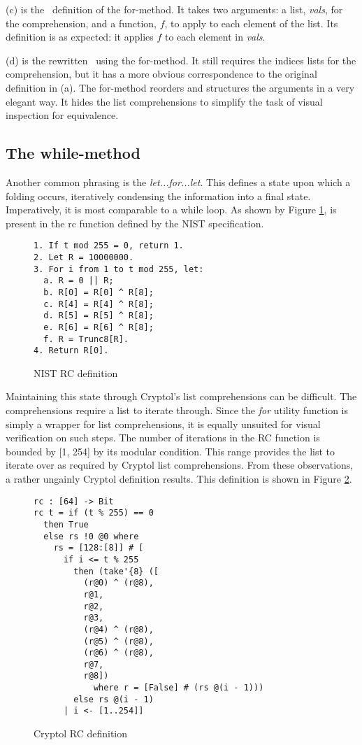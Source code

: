 (c) is the \cryptol\ definition of the for-method.
It takes two arguments: a list, \emph{vals}, for the comprehension, and a function, $f$, to apply to each element of the list.
Its definition is as expected: it applies $f$ to each element in \emph{vals}.

(d) is the rewritten \cryptol\ using the for-method.
It still requires the indices lists for the comprehension, but it has a more obvious correspondence to the original definition in (a).
The for-method reorders and structures the arguments in a very elegant way.
It hides the list comprehensions to simplify the task of visual inspection for equivalence.

\subsection{The while-method}
Another common phrasing is the \emph{let...for...let}. 
This defines a state upon which a folding occurs, iteratively condensing the information into a final state. 
Imperatively, it is most comparable to a while loop. 
As shown by Figure \ref{fig:nistRC}, is present in the rc function defined by the NIST specification.

\begin{figure}[h]
  \centering
\begin{lstlisting}[basewidth = {.5em},basicstyle={\scriptsize}]
1. If t mod 255 = 0, return 1.
2. Let R = 10000000.
3. For i from 1 to t mod 255, let:
  a. R = 0 || R;
  b. R[0] = R[0] ^ R[8];
  c. R[4] = R[4] ^ R[8];
  d. R[5] = R[5] ^ R[8];
  e. R[6] = R[6] ^ R[8];
  f. R = Trunc8[R].
4. Return R[0].
\end{lstlisting}
\caption{NIST RC definition}
\label{fig:nistRC}
\end{figure}

Maintaining this state through Cryptol's list comprehensions can be difficult.
The comprehensions require a list to iterate through. 
Since the \emph{for} utility function is simply a wrapper for list comprehensions, it is equally unsuited for visual verification on such steps. 
The number of iterations in the RC function is bounded by [1, 254] by its modular condition.
This range provides the list to iterate over as required by Cryptol list comprehensions. 
From these observations, a rather ungainly Cryptol definition results.
This definition is shown in Figure \ref{fig:cryptolRC}.

\begin{figure}[h]
  \centering
\begin{lstlisting}[language=Cryptol]
rc : [64] -> Bit
rc t = if (t % 255) == 0 
  then True 
  else rs !0 @0 where
    rs = [128:[8]] # [
      if i <= t % 255
        then (take'{8} ([
          (r@0) ^ (r@8),
          r@1,
          r@2,
          r@3, 
          (r@4) ^ (r@8),
          (r@5) ^ (r@8),
          (r@6) ^ (r@8),
          r@7,
          r@8])
            where r = [False] # (rs @(i - 1)))
        else rs @(i - 1)
      | i <- [1..254]]
\end{lstlisting}
\caption{Cryptol RC definition}
\label{fig:cryptolRC}
\end{figure}

